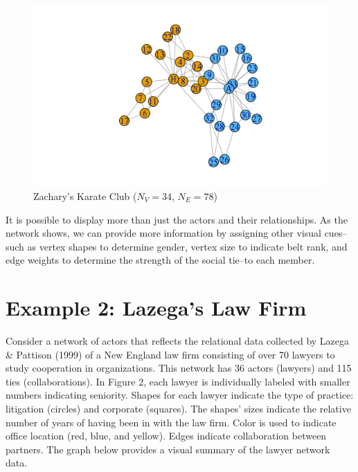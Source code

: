\documentclass[12pt,twoside]{amherstthesis}
\begin{document}
  \begin{figure}[htbp]
  \centering
  \includegraphics{figure/01karateplot.png}
  \caption{Zachary's Karate Club (\(N_V = 34\), \(N_E = 78\))}
  \end{figure}
  
  It is possible to display more than just the actors and their
  relationships. As the network shows, we can provide more information by
  assigning other visual cues--such as vertex shapes to determine gender,
  vertex size to indicate belt rank, and edge weights to determine the
  strength of the social tie--to each member.
  
  \section{Example 2: Lazega's Law Firm}\label{example-2-lazegas-law-firm}
  
  Consider a network of actors that reflects the relational data collected
  by Lazega \& Pattison (1999) of a New England law firm consisting of
  over 70 lawyers to study cooperation in organizations. This network has
  36 actors (lawyers) and 115 ties (collaborations). In Figure 2, each
  lawyer is individually labeled with smaller numbers indicating
  seniority. Shapes for each lawyer indicate the type of practice:
  litigation (circles) and corporate (squares). The shapes' sizes indicate
  the relative number of years of having been in with the law firm. Color
  is used to indicate office location (red, blue, and yellow). Edges
  indicate collaboration between partners. The graph below provides a
  visual summary of the lawyer network data.
  
\end{document}
